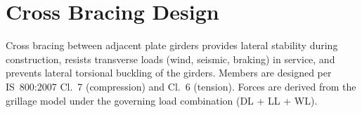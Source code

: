 \documentclass[12pt,a4paper]{report}
\numberwithin{table}{chapter}
\numberwithin{figure}{chapter}
\begin{document}
\section{Cross Bracing Design}
\label{sec:cross-bracing}

Cross bracing between adjacent plate girders provides lateral stability during construction, resists transverse loads (wind, seismic, braking) in service, and prevents lateral torsional buckling of the girders. Members are designed per IS~800:2007 Cl.~7 (compression) and Cl.~6 (tension). Forces are derived from the grillage model under the governing load combination  (DL + LL + WL).

\vspace{1em}

\vspace{0.4em}
\noindent
\end{document}
